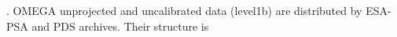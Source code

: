 .
OMEGA unprojected and uncalibrated data (level1b) are distributed by ESA-PSA and PDS
archives.
Their structure is 